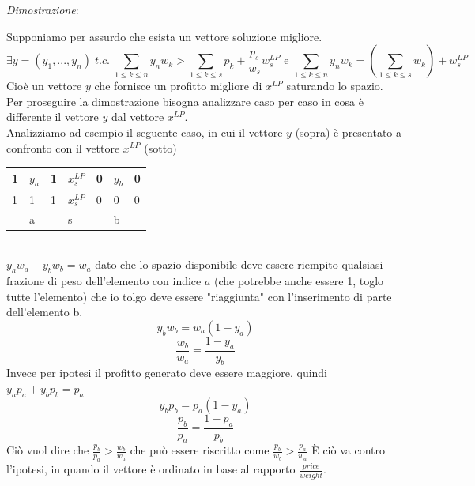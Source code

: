 \documentclass[a4paper]{article}
\newenvironment{dimostrazione}{\textit{Dimostrazione}:\begin{adjustwidth}{1cm}{}}{\end{adjustwidth}}
\begin{document}
\begin{dimostrazione}
	Supponiamo per assurdo che esista un vettore soluzione migliore.
	$$ \exists y =(y_1, ..., y_n) \; t.c. \; \sum_{1 \leq k \leq n}y_nw_k > \sum_{1 \leq k \leq s} p_k+\frac{p_s}{w_s}w_s^{LP} \text{ e }\sum_{1 \leq k \leq n}y_nw_k = (\sum_{1 \leq k \leq s}w_k)+ w_s^{LP}  $$
	Cioè un vettore $y$ che fornisce un profitto migliore di $x^{LP}$ saturando lo spazio.\\
	Per proseguire la dimostrazione bisogna analizzare caso per caso in cosa è differente il vettore $y$ dal vettore $x^{LP}$.\\
	Analizziamo ad esempio il seguente caso, in cui il vettore $y$ (sopra) è presentato a confronto con il vettore $x^{LP}$ (sotto)\\
	\begin{table}[!ht]
		\centering
\begin{tabular}{lllllll}
\hline
\multicolumn{1}{|l|}{1} & \multicolumn{1}{l|}{$y_a$} & \multicolumn{1}{l|}{1} & \multicolumn{1}{l|}{$x_s^{LP}$} & \multicolumn{1}{l|}{0} & \multicolumn{1}{l|}{$y_b$} & \multicolumn{1}{l|}{0} \\ \hline
\multicolumn{1}{|l|}{1} & \multicolumn{1}{l|}{1}    & \multicolumn{1}{l|}{1} & \multicolumn{1}{l|}{$x_s^{LP}$} & \multicolumn{1}{l|}{0} & \multicolumn{1}{l|}{0}    & \multicolumn{1}{l|}{0} \\ \hline
                        & a                         &                        & s                                                 &                        & b                         &                       
\end{tabular}
\end{table}\\
$y_aw_a +  y_bw_b = w_a$ dato che lo spazio disponibile deve essere riempito qualsiasi frazione di peso dell'elemento con indice $a$ (che potrebbe anche essere 1, toglo tutte l'elemento) che io tolgo deve essere "riaggiunta" con l'inserimento di parte dell'elemento b.
$$y_bw_b=w_a(1-y_a)$$
$$\frac{w_b}{w_a}=\frac{1-y_a}{y_b}$$
Invece per ipotesi il profitto generato deve essere maggiore, quindi $y_ap_a +  y_bp_b = p_a$
$$y_bp_b=p_a(1-y_a)$$
$$\frac{p_b}{p_a}=\frac{1-p_a}{p_b}$$
Ciò vuol dire che $\frac{p_b}{p_a} > \frac{w_b}{w_a}$ che può essere riscritto come $\frac{p_b}{w_b} > \frac{p_a}{w_a}$%
È ciò va contro l'ipotesi, in quando il vettore è ordinato in base al rapporto $\frac{price}{weight}$.
\end{dimostrazione}
\end{document}
